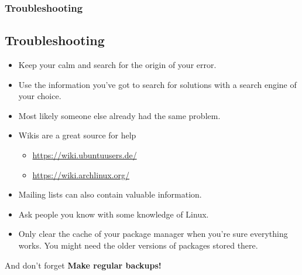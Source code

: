 \begin{frame}
	\frametitle{Troubleshooting}
	\subsection{Troubleshooting}
	
	\begin{itemize}
		\item Keep your calm and search for the origin of your error.
		\item Use the information you've got to search for solutions with a search engine of your choice.
		\item Most likely someone else already had the same problem.
		\item Wikis are a great source for help
			\begin{itemize}
				\item \url{https://wiki.ubuntuusers.de/}
				\item \url{https://wiki.archlinux.org/}
			\end{itemize}
		\item Mailing lists can also contain valuable information.
		\item Ask people you know with some knowledge of Linux.
		\item Only clear the cache of your package manager when you're sure everything works. You might need the older versions of packages stored there.
	\end{itemize}

	\vfill

	\begin{alertblock}{And don't forget}
		\textbf{Make regular backups!}
	\end{alertblock}
\end{frame}
